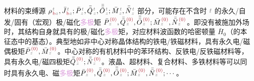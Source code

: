 材料的束缚源 ${\rho}^{\;\!\mathcolor{gray}{t}}_{\;\!\textcolor{Maroon}{\text{b}}\mathcolor{gray}{z}}, \bar{J}^{\;\!\mathcolor{gray}{t}}_{\;\!\textcolor{Maroon}{\text{b}}\mathcolor{gray}{z}};\bar{P}^{\;\!\mathcolor{gray}{t}}_{\;\!\mathcolor{gray}{z}},\bar{\bar{Q}}^{\;\!\mathcolor{gray}{t}}_{\;\!\mathcolor{gray}{z}},\bar{\bar{\bar{O}}}^{\;\!\mathcolor{gray}{t}}_{\;\!\mathcolor{gray}{z}} ; \bar{M}^{\;\!\mathcolor{gray}{t}}_{\;\!\mathcolor{gray}{z}}, \bar{\bar{N}}^{\;\!\mathcolor{gray}{t}}_{\;\!\mathcolor{gray}{z}}$ 部分，可能存在不含时 $\mathcolor{gray}{t}$ 的永久/自发/固有（宏观）极/磁化\textcolor{Plum}{多极}矩 $\bar{P}^{\;\!\textcolor{Maroon}{(0)}}_{\;\!\mathcolor{gray}{z}},\bar{\bar{Q}}^{\;\!\textcolor{Maroon}{(0)}}_{\;\!\mathcolor{gray}{z}},\bar{\bar{\bar{O}}}^{\;\!\textcolor{Maroon}{(0)}}_{\;\!\mathcolor{gray}{z}} ; \bar{M}^{\;\!\textcolor{Maroon}{(0)}}_{\;\!\mathcolor{gray}{z}}, \bar{\bar{N}}^{\;\!\textcolor{Maroon}{(0)}}_{\;\!\mathcolor{gray}{z}}$。即没有被施加外场时，其结构自身就具有的极/磁化\textcolor{Plum}{多极}矩，对应材料\textcolor{NavyBlue}{波函数}的\textcolor{NavyBlue}{哈密顿量} $\bar{H}_0$（的\textcolor{NavyBlue}{本征态}中的\textcolor{NavyBlue}{基态}）。典型地如非中心对称晶体结构的铁电/铁磁材料，具有永久\textcolor{NavyBlue}{电}/\textcolor{NavyBlue}{磁偶极矩}$\bar{P}^{\;\!\textcolor{Maroon}{(0)}}_{\;\!\mathcolor{gray}{z}}, \bar{M}^{\;\!\textcolor{Maroon}{(0)}}_{\;\!\mathcolor{gray}{z}}$。中心对称的有机材料中的苯环结构、反铁电/反铁磁材料等，具有永久\textcolor{NavyBlue}{电}/\textcolor{NavyBlue}{磁四极矩}$\bar{\bar{Q}}^{\;\!\textcolor{Maroon}{(0)}}_{\;\!\mathcolor{gray}{z}};\bar{\bar{N}}^{\;\!\textcolor{Maroon}{(0)}}_{\;\!\mathcolor{gray}{z}}$。液晶、超材料、复合材料、多铁材料等可以同时具有永久\textcolor{NavyBlue}{电}、\textcolor{NavyBlue}{磁}\textcolor{Plum}{多极}矩$\bar{P}^{\;\!\textcolor{Maroon}{(0)}}_{\;\!\mathcolor{gray}{z}},\bar{\bar{Q}}^{\;\!\textcolor{Maroon}{(0)}}_{\;\!\mathcolor{gray}{z}},\bar{\bar{\bar{O}}}^{\;\!\textcolor{Maroon}{(0)}}_{\;\!\mathcolor{gray}{z}} ; \bar{M}^{\;\!\textcolor{Maroon}{(0)}}_{\;\!\mathcolor{gray}{z}}, \bar{\bar{N}}^{\;\!\textcolor{Maroon}{(0)}}_{\;\!\mathcolor{gray}{z}}; \cdots$。


